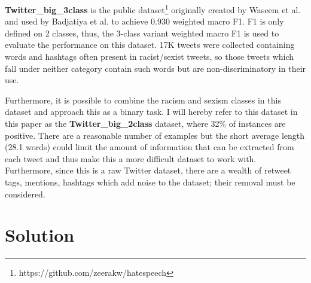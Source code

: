 \documentclass[12pt,a4paper]{article}
\begin{document}
\textbf{Twitter\_big\_3class} is the public dataset\footnote{https://github.com/zeerakw/hatespeech} originally created by Waseem et al. \citeyear{Waseem} and used by Badjatiya et al.\citeyear{Badjatiya} to achieve 0.930 weighted macro F1. F1 is only defined on 2 classes, thus, the 3-class variant weighted macro F1 is used to evaluate the performance on this dataset. 17K tweets were collected containing words and hashtags often present in racist/sexist tweets, so those tweets which fall under neither category contain such words but are non-discriminatory in their use.

Furthermore, it is possible to combine the racism and sexism classes in this dataset and approach this as a binary task. I will hereby refer to this dataset in this paper as the \textbf{Twitter\_big\_2class} dataset, where 32\% of instances are positive. There are a reasonable number of examples but the short average length (28.1 words) could limit the amount of information that can be extracted from each tweet and thus make this a more difficult dataset to work with. Furthermore, since this is a raw Twitter dataset, there are a wealth of retweet tags, mentions, hashtags which add noise to the dataset; their removal must be considered.


\section{Solution}
\end{document}
